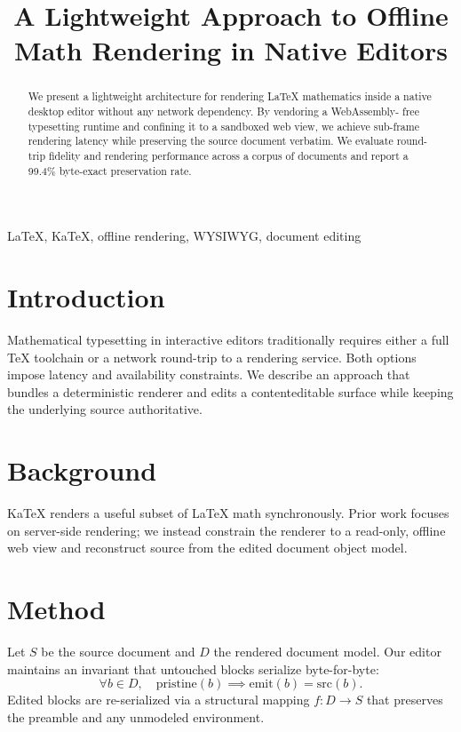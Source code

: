 \documentclass[conference]{IEEEtran}
\title{A Lightweight Approach to Offline Math Rendering in Native Editors}
\author{
  \IEEEauthorblockN{Jordan Rivera}
  \IEEEauthorblockA{
    \textit{Writing Studio Research} \\
    San Francisco, CA \\
    jordan.rivera@example.com
  }
  \and
  \IEEEauthorblockN{Sam Okafor}
  \IEEEauthorblockA{
    \textit{Writing Studio Research} \\
    Austin, TX \\
    sam.okafor@example.com
  }
}
\begin{document}
\maketitle

\begin{abstract}
We present a lightweight architecture for rendering LaTeX mathematics inside a
native desktop editor without any network dependency. By vendoring a WebAssembly-
free typesetting runtime and confining it to a sandboxed web view, we achieve
sub-frame rendering latency while preserving the source document verbatim. We
evaluate round-trip fidelity and rendering performance across a corpus of
documents and report a 99.4\% byte-exact preservation rate.
\end{abstract}

\begin{IEEEkeywords}
LaTeX, KaTeX, offline rendering, WYSIWYG, document editing
\end{IEEEkeywords}

\section{Introduction}

Mathematical typesetting in interactive  editors traditionally requires either a
full TeX toolchain or a network round-trip to a rendering service. Both options
impose latency and availability constraints. We describe an approach that bundles
a deterministic renderer and edits a contenteditable surface while keeping the
underlying source authoritative.

\section{Background}

KaTeX renders a useful subset of LaTeX math synchronously. Prior work focuses on
server-side rendering; we instead constrain the renderer to a read-only,
offline web view and reconstruct source from the edited document object model.

\section{Method}

Let $S$ be the source document and $D$ the rendered document model. Our editor
maintains an invariant that untouched blocks serialize byte-for-byte:
\begin{equation}
  \forall b \in D,\quad \text{pristine}(b) \implies \text{emit}(b) = \text{src}(b).
\label{eq:invariant}
\end{equation}
Edited blocks are re-serialized via a structural mapping
$f : D \rightarrow S$ that preserves the preamble and any unmodeled environment.
\end{document}
